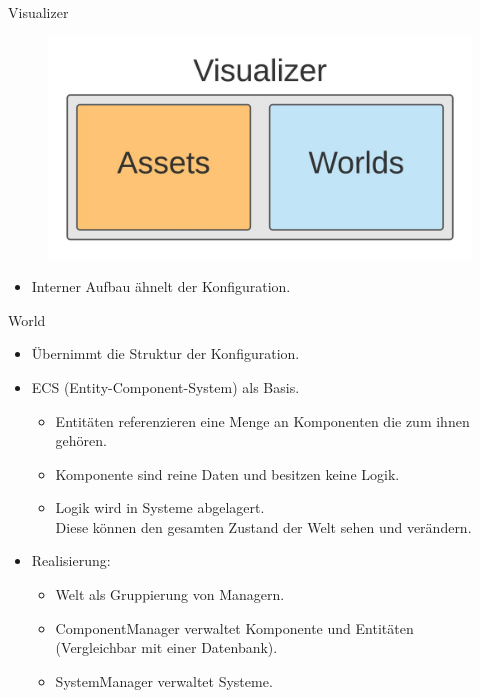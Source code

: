 \documentclass{presentation}
\begin{document}
\begin{frame}{Visualizer}
    \begin{figure}
        \includegraphics[scale=0.6]{visualizer_structure.jpg}
    \end{figure}
    
    \begin{itemize}
        \item Interner Aufbau ähnelt der Konfiguration.
    \end{itemize}
\end{frame}

\begin{frame}{World}
    \begin{itemize}
        \item Übernimmt die Struktur der Konfiguration.
        \item ECS (Entity-Component-System) als Basis.
        \begin{itemize}
            \item Entitäten referenzieren eine Menge an Komponenten die zum ihnen gehören.
            \item Komponente sind reine Daten und besitzen keine Logik.
            \item Logik wird in Systeme abgelagert. \\
                    Diese können den gesamten Zustand der Welt sehen und verändern.
        \end{itemize}
        \item Realisierung:
        \begin{itemize}
            \item Welt als Gruppierung von Managern.
            \item ComponentManager verwaltet Komponente und Entitäten \\
                    (Vergleichbar mit einer Datenbank).
            \item SystemManager verwaltet Systeme.
        \end{itemize}
    \end{itemize}
\end{frame}
\end{document}
